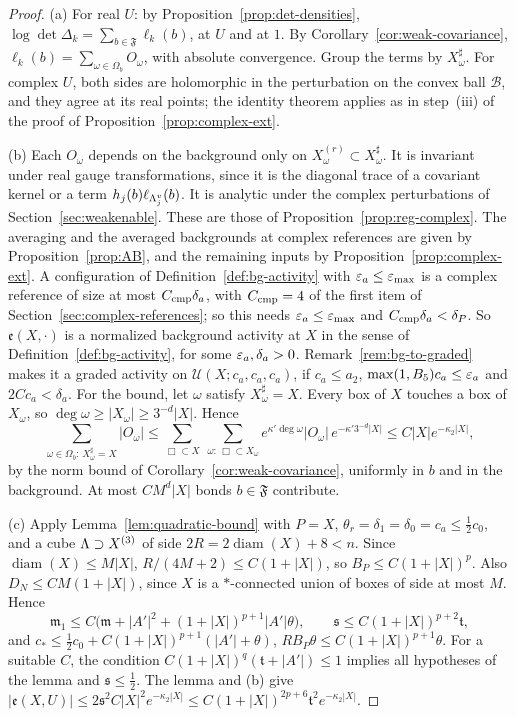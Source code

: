 \begin{proof}
(a) For real $U$: by Proposition~\ref{prop:det-densities}, $\log\det\Delta_k=\sum_{b\in\mathfrak F}\ell_k(b)$, at $U$ and at $1$. By Corollary~\ref{cor:weak-covariance}, $\ell_k(b)=\sum_{\omega\in\Omega_b}O_\omega$, with absolute convergence. Group the terms by $X^\sharp_\omega$. For complex $U$, both sides are holomorphic in the perturbation on the convex ball $\mathcal B$, and they agree at its real points; the identity theorem applies as in step~(iii) of the proof of Proposition~\ref{prop:complex-ext}.

(b) Each $O_\omega$ depends on the background only on $X_\omega^{(r)}\subset X^\sharp_\omega$. It is invariant under real gauge transformations, since it is the diagonal trace of a covariant kernel or a term $h_j(b)\ell_{\Lambda^v_j}(b)$. It is analytic under the complex perturbations of Section~\ref{sec:weakenable}. These are those of Proposition~\ref{prop:reg-complex}. The averaging and the averaged backgrounds at complex references are given by Proposition~\ref{prop:AB}, and the remaining inputs by Proposition~\ref{prop:complex-ext}. A configuration of Definition~\ref{def:bg-activity} with $\varepsilon_a\le\varepsilon_{\max}$ is a complex reference of size at most $C_{\rm cmp}\delta_a$, with $C_{\rm cmp}=4$ of the first item of Section~\ref{sec:complex-references}; so this needs $\varepsilon_a\le\varepsilon_{\max}$ and $C_{\rm cmp}\delta_a<\delta_P$. So $\mathfrak e(X,\cdot)$ is a normalized background activity at $X$ in the sense of Definition~\ref{def:bg-activity}, for some $\varepsilon_a,\delta_a>0$. Remark~\ref{rem:bg-to-graded} makes it a graded activity on $\mathcal U(X;c_a,c_a,c_a)$, if $c_a\le a_2$, $\max(1,B_5)c_a\le\varepsilon_a$ and $2Cc_a<\delta_a$. For the bound, let $\omega$ satisfy $X^\sharp_\omega=X$. Every box of $X$ touches a box of $X_\omega$, so $\deg\omega\ge|X_\omega|\ge3^{-d}|X|$. Hence
\[
\sum_{\omega\in\Omega_b:\,X^\sharp_\omega=X}|O_\omega|\le\sum_{\Box\subset X}\ \sum_{\omega:\,\Box\subset X_\omega}e^{\kappa'\deg\omega}|O_\omega|\,e^{-\kappa'3^{-d}|X|}\le C|X|e^{-\kappa_2|X|},
\]
by the norm bound of Corollary~\ref{cor:weak-covariance}, uniformly in $b$ and in the background. At most $CM^d|X|$ bonds $b\in\mathfrak F$ contribute.

(c) Apply Lemma~\ref{lem:quadratic-bound} with $P=X$, $\theta_r=\delta_1=\delta_0=c_a\le\frac12c_0$, and a cube $\Lambda\supset X^{(3)}$ of side $2R=2\operatorname{diam}(X)+8<n$. Since $\operatorname{diam}(X)\le M|X|$, $R/(4M+2)\le C(1+|X|)$, so $B_P\le C(1+|X|)^p$. Also $D_N\le CM(1+|X|)$, since $X$ is a $*$-connected union of boxes of side at most $M$. Hence
\[
\mathfrak m_1\le C\big(\mathfrak m+|A'|^2+(1+|X|)^{p+1}|A'|\theta\big),\qquad\mathfrak s\le C(1+|X|)^{p+2}\mathfrak t ,
\]
and $c_*\le\frac12c_0+C(1+|X|)^{p+1}(|A'|+\theta)$, $RB_P\theta\le C(1+|X|)^{p+1}\theta$. For a suitable $C$, the condition $C(1+|X|)^q(\mathfrak t+|A'|)\le1$ implies all hypotheses of the lemma and $\mathfrak s\le\frac12$. The lemma and (b) give $|\mathfrak e(X,U)|\le2\mathfrak s^2C|X|^2e^{-\kappa_2|X|}\le C(1+|X|)^{2p+6}\mathfrak t^2e^{-\kappa_2|X|}$.


\end{proof}
